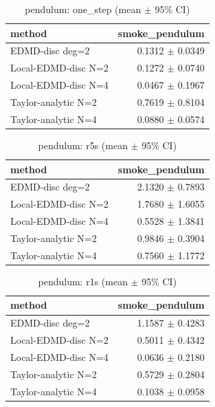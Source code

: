 \begin{table}[h]\centering
\small
\caption{pendulum: one_step (mean $\pm$ 95\% CI)}
\begin{tabular}{lr}
\toprule
method & smoke\_pendulum \\
\midrule
EDMD-disc deg=2 & 0.1312 $\pm$ 0.0349 \\
Local-EDMD-disc N=2 & 0.1272 $\pm$ 0.0740 \\
Local-EDMD-disc N=4 & 0.0467 $\pm$ 0.1967 \\
Taylor-analytic N=2 & 0.7619 $\pm$ 0.8104 \\
Taylor-analytic N=4 & 0.0880 $\pm$ 0.0574 \\
\bottomrule
\end{tabular}
\end{table}

\begin{table}[h]\centering
\small
\caption{pendulum: r5s (mean $\pm$ 95\% CI)}
\begin{tabular}{lr}
\toprule
method & smoke\_pendulum \\
\midrule
EDMD-disc deg=2 & 2.1320 $\pm$ 0.7893 \\
Local-EDMD-disc N=2 & 1.7680 $\pm$ 1.6055 \\
Local-EDMD-disc N=4 & 0.5528 $\pm$ 1.3841 \\
Taylor-analytic N=2 & 0.9846 $\pm$ 0.3904 \\
Taylor-analytic N=4 & 0.7560 $\pm$ 1.1772 \\
\bottomrule
\end{tabular}
\end{table}

\begin{table}[h]\centering
\small
\caption{pendulum: r1s (mean $\pm$ 95\% CI)}
\begin{tabular}{lr}
\toprule
method & smoke\_pendulum \\
\midrule
EDMD-disc deg=2 & 1.1587 $\pm$ 0.4283 \\
Local-EDMD-disc N=2 & 0.5011 $\pm$ 0.4342 \\
Local-EDMD-disc N=4 & 0.0636 $\pm$ 0.2180 \\
Taylor-analytic N=2 & 0.5729 $\pm$ 0.2804 \\
Taylor-analytic N=4 & 0.1038 $\pm$ 0.0958 \\
\bottomrule
\end{tabular}
\end{table}

